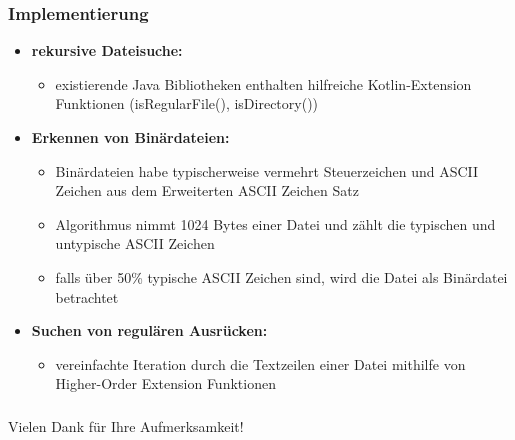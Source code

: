 \documentclass{beamer}
\begin{document}
\begin{frame}
\frametitle{Implementierung}
\begin{itemize}
\onehalfspacing
    \item \textbf{rekursive Dateisuche:}
    \begin{itemize}
        \item existierende Java Bibliotheken enthalten hilfreiche Kotlin-Extension Funktionen (isRegularFile(), isDirectory())
    \end{itemize}
    \item \textbf{Erkennen von Binärdateien:}
    \begin{itemize}
        \item Binärdateien habe typischerweise vermehrt Steuerzeichen und ASCII Zeichen aus dem Erweiterten ASCII Zeichen Satz
        \item Algorithmus nimmt 1024 Bytes einer Datei und zählt die typischen und untypische ASCII Zeichen
        \item falls über 50\% typische ASCII Zeichen sind, wird die Datei als Binärdatei betrachtet
    \end{itemize}
    \item \textbf{Suchen von regulären Ausrücken:}
    \begin{itemize}
        \item vereinfachte Iteration durch die Textzeilen einer Datei mithilfe von Higher-Order Extension Funktionen
    \end{itemize}
\end{itemize}
\end{frame}

\begin{frame}
\frametitle{}
{\Large \centering Vielen Dank für Ihre Aufmerksamkeit!\par}
\end{frame}
\end{document}
